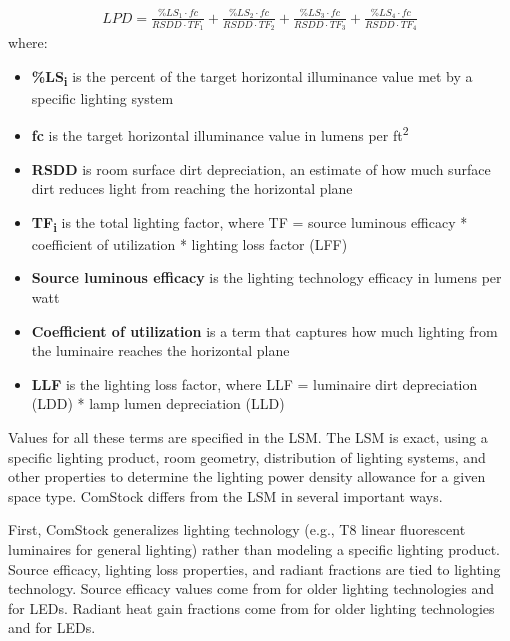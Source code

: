 \begin{align}
\label{lsm_lpd_eqn}
LPD = \frac{\% LS_{1} \cdot fc}{RSDD \cdot TF_{1}} + \frac{\% LS_{2} \cdot fc}{RSDD \cdot TF_{2}} + \frac{\% LS_{3} \cdot fc}{RSDD \cdot TF_{3}} + \frac{\% LS_{4} \cdot fc}{RSDD \cdot TF_{4}}
\end{align}
where:\\
\begin{itemize}
\item \textbf{\%LS\textsubscript{i}} is the percent of the target horizontal illuminance value met by a specific lighting system\\
\item \textbf{fc} is the target horizontal illuminance value in lumens per ft\textsuperscript{2}\\
\item \textbf{RSDD} is room surface dirt depreciation, an estimate of how much surface dirt reduces light from reaching the horizontal plane\\
\item \textbf{TF\textsubscript{i}} is the total lighting factor, where TF = source luminous efficacy * coefficient of utilization * lighting loss factor (LFF)\\
\item \textbf{Source luminous efficacy} is the lighting technology efficacy in lumens per watt\\
\item \textbf{Coefficient of utilization} is a term that captures how much lighting from the luminaire reaches the horizontal plane\\
\item \textbf{LLF} is the lighting loss factor, where LLF  = luminaire dirt depreciation (LDD) * lamp lumen depreciation (LLD)\\
\end{itemize}

Values for all these terms are specified in the LSM.  The LSM is exact, using a specific lighting product, room geometry, distribution of lighting systems, and other properties to determine the lighting power density allowance for a given space type. ComStock differs from the LSM in several important ways.

First, ComStock generalizes lighting technology (e.g., T8 linear fluorescent luminaires for general lighting) rather than modeling a specific lighting product.  Source efficacy, lighting loss properties, and radiant fractions are tied to lighting technology. Source efficacy values come from \cite{doe2015lmc} for older lighting technologies and \cite{doe2019ssl} for LEDs.  Radiant heat gain fractions come from \cite{ashrae_rp1282} for older lighting technologies and \cite{ashrae_rp1681} for LEDs.

